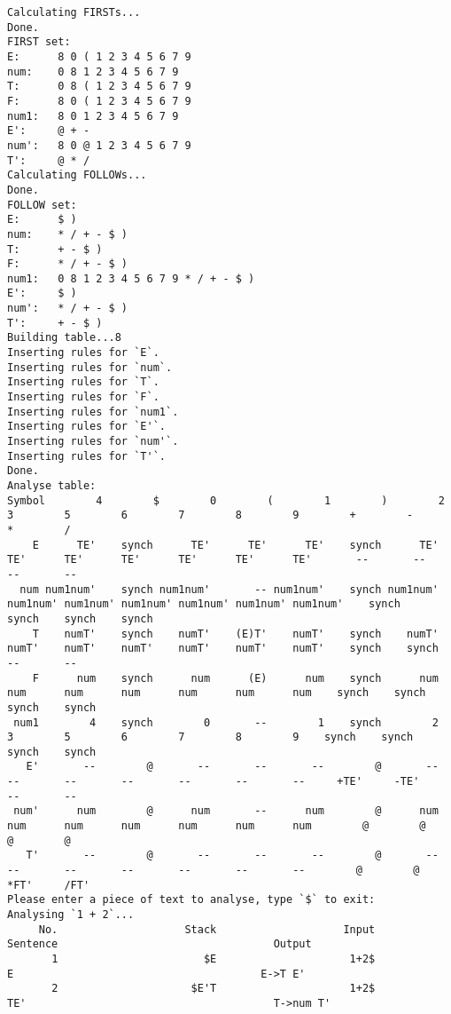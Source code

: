 \documentclass[UTF8]{ctexart}
\begin{document}
\begin{lstlisting}
Calculating FIRSTs...
Done.
FIRST set:
E:      8 0 ( 1 2 3 4 5 6 7 9
num:    0 8 1 2 3 4 5 6 7 9
T:      0 8 ( 1 2 3 4 5 6 7 9
F:      8 0 ( 1 2 3 4 5 6 7 9
num1:   8 0 1 2 3 4 5 6 7 9
E':     @ + -
num':   8 0 @ 1 2 3 4 5 6 7 9
T':     @ * /
Calculating FOLLOWs...
Done.
FOLLOW set:
E:      $ )
num:    * / + - $ )
T:      + - $ )
F:      * / + - $ )
num1:   0 8 1 2 3 4 5 6 7 9 * / + - $ )
E':     $ )
num':   * / + - $ )
T':     + - $ )
Building table...8
Inserting rules for `E`.
Inserting rules for `num`.
Inserting rules for `T`.
Inserting rules for `F`.
Inserting rules for `num1`.
Inserting rules for `E'`.
Inserting rules for `num'`.
Inserting rules for `T'`.
Done.
Analyse table:
Symbol        4        $        0        (        1        )        2        3        5        6        7        8        9        +        -        *        /
    E      TE'    synch      TE'      TE'      TE'    synch      TE'      TE'      TE'      TE'      TE'      TE'      TE'       --       --       --       --
  num num1num'    synch num1num'       -- num1num'    synch num1num' num1num' num1num' num1num' num1num' num1num' num1num'    synch    synch    synch    synch
    T    numT'    synch    numT'    (E)T'    numT'    synch    numT'    numT'    numT'    numT'    numT'    numT'    numT'    synch    synch       --       --
    F      num    synch      num      (E)      num    synch      num      num      num      num      num      num      num    synch    synch    synch    synch
 num1        4    synch        0       --        1    synch        2        3        5        6        7        8        9    synch    synch    synch    synch
   E'       --        @       --       --       --        @       --       --       --       --       --       --       --     +TE'     -TE'       --       --
 num'      num        @      num       --      num        @      num      num      num      num      num      num      num        @        @        @        @
   T'       --        @       --       --       --        @       --       --       --       --       --       --       --        @        @     *FT'     /FT'
Please enter a piece of text to analyse, type `$` to exit:
Analysing `1 + 2`...
     No.                    Stack                    Input                      Sentence                                  Output
       1                       $E                     1+2$                              E                                       E->T E'
       2                     $E'T                     1+2$                              TE'                                       T->num T'

\end{lstlisting}
\end{document}
